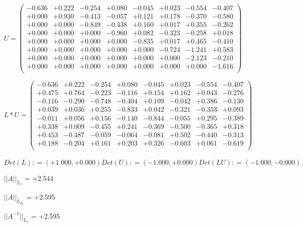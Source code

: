 \documentclass[9pt]{article}
\theoremstyle{plain}
\theoremstyle{definition}
\theoremstyle{remark}
\numberwithin{equation}{section}
\begin{document}
$U = \left(
\begin{array}{
cccccccc}
-0.636 & +0.222 & -0.254 & +0.080 & -0.045 & +0.023 & -0.554 & -0.407 \\
+0.000 & +0.930 & -0.413 & -0.057 & +0.121 & +0.178 & -0.370 & -0.580 \\
+0.000 & +0.000 & -0.849 & -0.438 & +0.160 & +0.017 & +0.355 & -0.262 \\
+0.000 & +0.000 & +0.000 & -0.960 & +0.082 & -0.323 & -0.258 & +0.018 \\
+0.000 & +0.000 & +0.000 & +0.000 & -0.835 & +0.017 & +0.465 & -0.410 \\
+0.000 & +0.000 & +0.000 & +0.000 & +0.000 & -0.724 & -1.241 & +0.583 \\
+0.000 & +0.000 & +0.000 & +0.000 & +0.000 & +0.000 & -2.123 & -0.210 \\
+0.000 & +0.000 & +0.000 & +0.000 & +0.000 & +0.000 & +0.000 & -1.616 \\
\end{array}
\right)$ \newline 

$L * U  = \left(
\begin{array}{
cccccccc}
-0.636 & +0.222 & -0.254 & +0.080 & -0.045 & +0.023 & -0.554 & -0.407 \\
+0.475 & +0.764 & -0.223 & -0.116 & +0.154 & +0.162 & +0.043 & -0.276 \\
-0.116 & -0.290 & -0.748 & -0.404 & +0.109 & -0.042 & +0.386 & -0.130 \\
+0.039 & +0.036 & +0.255 & -0.833 & +0.042 & -0.321 & -0.353 & +0.093 \\
-0.011 & +0.056 & +0.156 & -0.140 & -0.844 & -0.055 & +0.295 & -0.389 \\
+0.338 & +0.009 & -0.455 & +0.241 & -0.369 & -0.500 & -0.365 & +0.318 \\
+0.453 & -0.487 & -0.059 & -0.064 & -0.081 & +0.502 & -0.440 & -0.313 \\
+0.188 & -0.204 & +0.161 & +0.203 & +0.326 & -0.603 & +0.061 & -0.619 \\
\end{array}
\right)$ \newline 

$Det(L) :    = (+1.000,+0.000)     Det(U) :    = (-1.000,+0.000)     Det(LU) :    = (-1.000,-0.000)$

$||A||_{L_1}$  = +2.544

$||A||_{L_{\infty}}$ = +2.595

$||A^{-1}||_{L_1}$  = +2.595
\end{document}
